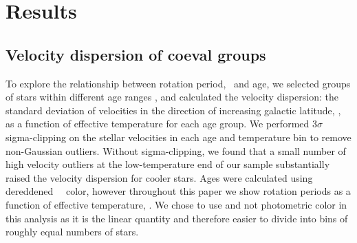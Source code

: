 \section{Results}
\label{sec:results}

\subsection{Velocity dispersion of coeval groups}

To explore the relationship between rotation period, \teff\ and age, we
selected groups of stars within different age ranges \citep[where age was
calculated using the][gyrochronology relation]{angus2019}, and calculated the
velocity dispersion: the standard deviation of velocities in the direction of
increasing galactic latitude, \sigmavb, as a function of effective temperature
for each age group.
We performed 3$\sigma$ sigma-clipping on the stellar velocities in each age
and temperature bin to remove non-Gaussian outliers.
Without sigma-clipping, we found that a small number of high velocity
outliers at the low-temperature end of our sample substantially raised the
velocity dispersion for cooler stars.
Ages were calculated using dereddened \gaia\ \gcolor\ color, however
throughout this paper we show rotation periods as a function of effective
temperature, \teff.
We chose to use \teff and not photometric color in this analysis as it is the
linear quantity and therefore easier to divide into bins of roughly equal
numbers of stars.


